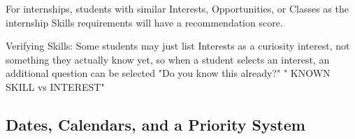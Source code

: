 \documentclass[english]{proposalnsf}
\begin{document}
		For internships, students with similar Interests, Opportunities, or Classes as the internship Skills requirements will have a recommendation score.
		
		Verifying Skills:
		Some students may just list Interests as a curiosity interest, not something they actually know yet, so when a student selects an interest, an additional question can be selected "Do you know this already?" " KNOWN SKILL vs INTEREST"
		
		
		
		\subsection{Dates, Calendars, and a Priority System}
		
	
\end{document}
